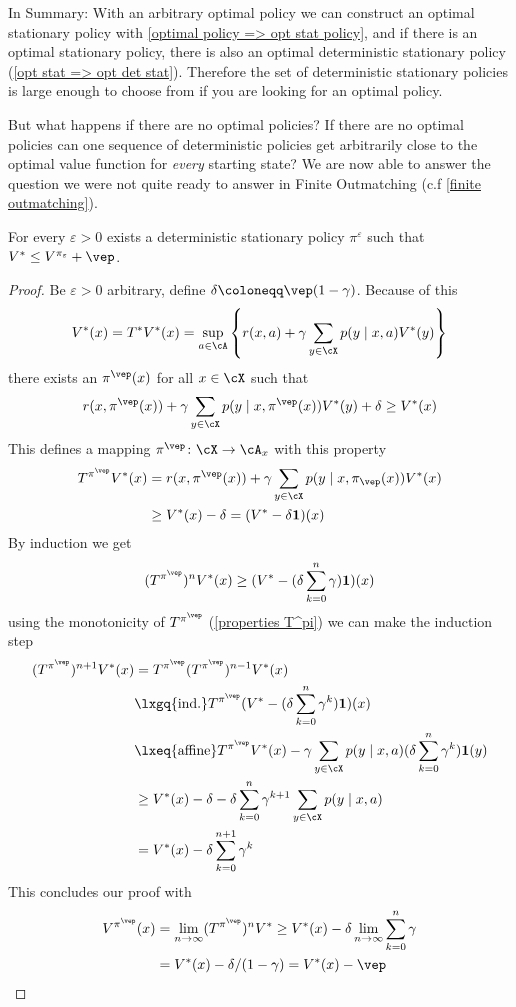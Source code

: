In Summary: With an arbitrary optimal policy we can construct an optimal stationary policy with \ref{optimal policy => opt stat policy}, and if there is an optimal stationary policy, there is also an optimal deterministic stationary policy (\ref{opt stat => opt det stat}). Therefore the set of deterministic stationary policies is large enough to choose from if you are looking for an optimal policy. 

But what happens if there are no optimal policies? If there are no optimal policies can one sequence of deterministic policies get arbitrarily close to the optimal value function for \emph{every} starting state? We are now able to answer the question we were not quite ready to answer in Finite Outmatching   (c.f \ref{finite outmatching}).

\begin{prop}\label{epsilon optimal}
	For every \(\varepsilon>0\) exists a deterministic stationary policy \(\pi^\varepsilon\) such that \(V^* \le V^{\pi_\varepsilon}+\vep \).
\end{prop}
\begin{proof}
	Be \(\varepsilon>0 \) arbitrary,  define \(\delta\coloneqq \vep (1-\gamma) \). Because of this
	\[
		V^*(x)=T^*V^*(x)=\sup_{a\in\cA}
		\left\{r(x,a)+\gamma\sum_{y\in\cX}p(y\mid x,a)V^*(y) \right\}
	\]
	there exists an \(\pi^\vep(x)\) for all \(x\in\cX\) such that
	\begin{align}\label{epsilon optimal policy}
		r(x,\pi^\vep(x))+\gamma\sum_{y\in\cX}p(y\mid x,\pi^\vep(x))V^*(y) + \delta \ge V^*(x)
	\end{align}
	This defines a mapping \(\pi^\vep\colon \cX\to\cA_x\) with this property
	\begin{align*}
		T^{\pi^\vep} V^*(x)
		&=r(x,\pi^\vep(x))+\gamma \sum_{y\in\cX}p(y\mid x,\pi_\vep(x)) V^*(x)\\
		&\ge V^*(x) -\delta = (V^* -\delta \mathbf{1}) (x)
	\end{align*}
	By induction we get 
	\[
		(T^{\pi^\vep})^n V^*(x)\ge (V^*-(\delta\sum_{k=0}^n\gamma) \mathbf{1}) (x)
	\] 
	using the monotonicity of \(T^{\pi^\vep}\) (\ref{properties T^pi}) we can make the induction step
	\begin{align*}
		(T^{\pi^\vep})^{n+1} V^*(x)
		&=T^{\pi^\vep} (T^{\pi^\vep})^{n-1} V^*(x)\\
		&\lxgq{\text{ind.}} T^{\pi^\vep} (V^*-(\delta\sum_{k=0}^n\gamma^k) \mathbf{1})(x)\\
		&\lxeq{\text{affine}} T^{\pi^\vep} V^*(x) - \gamma \sum_{y\in\cX} p(y\mid x, a) (\delta\sum_{k=0}^n\gamma^k) \mathbf{1}(y)\\
		&\ge V^*(x)-\delta - \delta\sum_{k=0}^n\gamma^{k+1} \sum_{y\in\cX} p(y\mid x,a)\\
		&=V^*(x)-\delta \sum_{k=0}^{n+1}\gamma^k
	\end{align*}
	This concludes our proof with
	\begin{align*}
		V^{\pi^\vep}(x)&=\lim_{n\to\infty} (T^{\pi^\vep})^n V^* 
		\ge V^*(x)-\delta\lim_{n\to\infty}\sum_{k=0}^n\gamma\\
		&=V^*(x)-\delta/(1-\gamma)=V^*(x)-\vep \qedhere
	\end{align*}
\end{proof}


